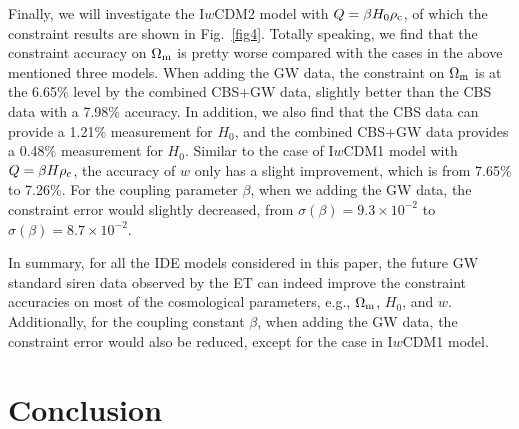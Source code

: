 \documentclass[aps,prd,nofootinbib,amsmath,amssymb,superscriptaddress,twocolumn,10pt]{revtex4}%
\newcommand{\red}{\textcolor[rgb]{1.00,0.00,0.00}}
\begin{document}
Finally, we will investigate the I$w$CDM2 model with $Q=\beta H_{0}\rho_{\rm c}$, of which the constraint results are shown in Fig.~\ref{fig4}. Totally speaking, we find that the constraint accuracy on $\Omega_{\rm m}$ is pretty worse compared with the cases in the above mentioned three models. When adding the GW data, the constraint on $\Omega_{\rm m}$ is at the 6.65\% level by the combined CBS+GW data, slightly better than the CBS data with a 7.98\% accuracy. In addition, we also find that the CBS data can provide a 1.21\% measurement for $H_0$, and the combined CBS+GW data provides a 0.48\% measurement for $H_0$. Similar to the case of I$w$CDM1 model with $Q=\beta H\rho_{\rm c}$, the accuracy of $w$ only has a slight improvement, which is from 7.65\% to 7.26\%. \red{For the coupling parameter $\beta$, when we adding the GW data, the constraint error would slightly decreased, from $\sigma(\beta)=9.3 \times 10^{-2}$ to $\sigma(\beta)=8.7 \times 10^{-2}$.}

In summary, for all the IDE models considered in this paper, the future GW standard siren data observed by the ET can indeed improve the constraint accuracies on most of the cosmological parameters, e.g., $\Omega_{\rm m}$, $H_0$, and $w$. \red{Additionally, for the coupling constant $\beta$, when adding the GW data, the constraint error would also be reduced, except for the case in I$w$CDM1 model.}



\section{Conclusion}\label{sec5}
\end{document}
